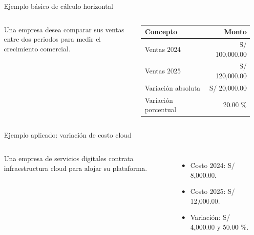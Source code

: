 \begin{frame}{Ejemplo básico de cálculo horizontal}
  \begin{columns}[T,onlytextwidth]
    \footnotesize
    Una empresa desea comparar sus ventas entre dos periodos para medir el crecimiento comercial.
    \vspace{0.35em}
    \begin{tabular}{lr}
      \toprule
      Concepto & Monto \\
      \midrule
      Ventas 2024 & S/ 100,000.00 \\
      Ventas 2025 & S/ 120,000.00 \\
      Variación absoluta & S/ 20,000.00 \\
      Variación porcentual & 20.00 \% \\
      \bottomrule
    \end{tabular}
  \end{columns}
\end{frame}

\begin{frame}{Ejemplo aplicado: variación de costo cloud}
  \begin{columns}[T,onlytextwidth]
    \footnotesize
    Una empresa de servicios digitales contrata infraestructura cloud para alojar su plataforma.
    \vspace{0.25em}
    \begin{itemize}
      \item Costo 2024: S/ 8,000.00.
      \item Costo 2025: S/ 12,000.00.
      \item Variación: S/ 4,000.00 y 50.00 \%.
    \end{itemize}
  \end{columns}
\end{frame}


